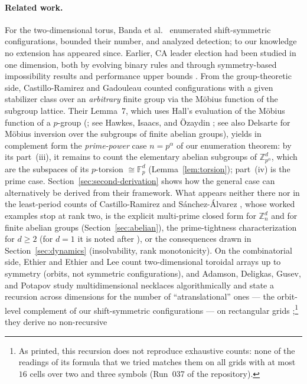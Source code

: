\documentclass[11pt,a4paper]{article}
\theoremstyle{remark}
\newcommand{\ZZ}{\mathbb{Z}}
\newcommand{\FF}{\mathbb{F}}
\begin{document}
\paragraph{Related work.}
For the two-dimensional torus, Banda et al.~\cite{banda2019} enumerated shift-symmetric
configurations, bounded their number, and analyzed detection; to our
knowledge no extension has appeared since. Earlier, CA leader election had
been studied in one dimension, both by evolving binary rules \cite{banda2011}
and through symmetry-based impossibility results and performance upper
bounds \cite{banda2015}. From the group-theoretic side,
Castillo-Ramirez and Gadouleau \cite{cg2017} counted configurations with a
given stabilizer class over an \emph{arbitrary} finite group via the
M\"obius function of the subgroup lattice. Their Lemma~7, which uses Hall's
evaluation of the M\"obius function of a $p$-group (\cite{hall1933}; see
Hawkes, Isaacs, and \"Ozaydin \cite[Cor.~3.5]{hio1989}; see also Delsarte
\cite{delsarte1948} for M\"obius inversion over the subgroups of finite
abelian groups), yields in
complement form the \emph{prime-power} case $n=p^\alpha$ of our enumeration
theorem: by its part~(iii), it remains to count the elementary abelian
subgroups of $\ZZ_{p^\alpha}^d$, which are the subspaces of its $p$-torsion
$\cong\FF_p^d$ (Lemma~\ref{lem:torsion}); part~(iv) is the prime case. Section~\ref{sec:second-derivation}
shows how the general case can alternatively be derived from their
framework. What appears neither there
nor in the least-period counts of Castillo-Ramirez and S\'anchez-\'Alvarez
\cite{cs2022}, whose worked examples stop at rank two, is the explicit
multi-prime closed form for $\ZZ_n^d$ and for finite abelian groups
(Section~\ref{sec:abelian}), the prime-tightness characterization for
$d\ge2$ (for $d=1$ it is noted after \cite[Lemma~7]{cg2017}), or the
consequences drawn in
Section~\ref{sec:dynamics} (insolvability, rank monotonicity). On the
combinatorial side, Ethier \cite{ethier2013} and Ethier and Lee
\cite{ethierlee2015} count two-dimensional toroidal arrays up to symmetry
(orbits, not symmetric configurations), and Adamson, Deligkas, Gusev, and
Potapov study multidimensional necklaces algorithmically and state a
recursion across dimensions for the number of ``atranslational'' ones ---
the orbit-level complement of our shift-symmetric configurations --- on
rectangular grids \cite[Thm.~3]{adamson2021};\footnote{As printed, this
recursion does not reproduce exhaustive counts: none of the readings of its
formula that we tried matches them on all grids with at most $16$ cells over
two and three symbols (Run~037 of the repository).} they derive no non-recursive
\end{document}
